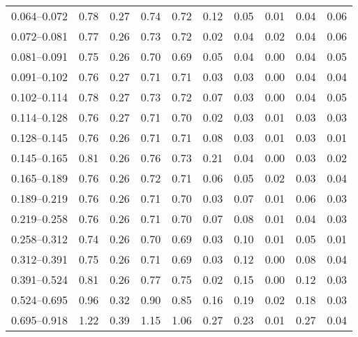 \begin{table}
\begin{center}
\begin{tabular}{@{}l l l l l l l l l l@{}}
            0.064--0.072     &  0.78   &  0.27   &  0.74         &  0.72      &  0.12    &  0.05  &  0.01       &  0.04  &  0.06  \\
            0.072--0.081     &  0.77   &  0.26   &  0.73         &  0.72      &  0.02    &  0.04  &  0.02       &  0.04  &  0.06  \\
            0.081--0.091     &  0.75   &  0.26   &  0.70         &  0.69      &  0.05    &  0.04  &  0.00       &  0.04  &  0.05  \\
            0.091--0.102     &  0.76   &  0.27   &  0.71         &  0.71      &  0.03    &  0.03  &  0.00       &  0.04  &  0.04  \\
            0.102--0.114     &  0.78   &  0.27   &  0.73         &  0.72      &  0.07    &  0.03  &  0.00       &  0.04  &  0.05  \\
            0.114--0.128     &  0.76   &  0.27   &  0.71         &  0.70      &  0.02    &  0.03  &  0.01       &  0.03  &  0.03  \\
            0.128--0.145     &  0.76   &  0.26   &  0.71         &  0.71      &  0.08    &  0.03  &  0.01       &  0.03  &  0.01  \\
            0.145--0.165     &  0.81   &  0.26   &  0.76         &  0.73      &  0.21    &  0.04  &  0.00       &  0.03  &  0.02  \\
            0.165--0.189     &  0.76   &  0.26   &  0.72         &  0.71      &  0.06    &  0.05  &  0.02       &  0.03  &  0.04  \\
            0.189--0.219     &  0.76   &  0.26   &  0.71         &  0.70      &  0.03    &  0.07  &  0.01       &  0.06  &  0.03  \\
            0.219--0.258     &  0.76   &  0.26   &  0.71         &  0.70      &  0.07    &  0.08  &  0.01       &  0.04  &  0.03  \\
            0.258--0.312     &  0.74   &  0.26   &  0.70         &  0.69      &  0.03    &  0.10  &  0.01       &  0.05  &  0.01  \\
            0.312--0.391     &  0.75   &  0.26   &  0.71         &  0.69      &  0.03    &  0.12  &  0.00       &  0.08  &  0.04  \\
            0.391--0.524     &  0.81   &  0.26   &  0.77         &  0.75      &  0.02    &  0.15  &  0.00       &  0.12  &  0.03  \\
            0.524--0.695     &  0.96   &  0.32   &  0.90         &  0.85      &  0.16    &  0.19  &  0.02       &  0.18  &  0.03  \\
            0.695--0.918     &  1.22   &  0.39   &  1.15         &  1.06      &  0.27    &  0.23  &  0.01       &  0.27  &  0.04  \\

\end{tabular}
\end{center}
\end{table}
